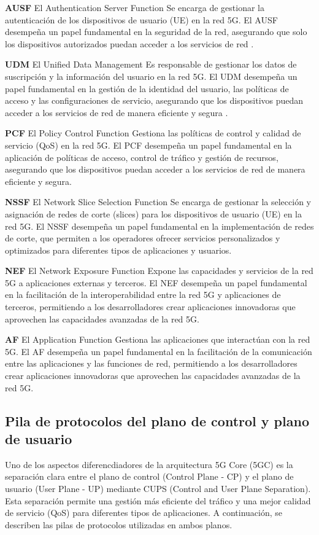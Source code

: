 \textbf{AUSF} El Authentication Server Function Se encarga de gestionar la autenticación de los dispositivos de usuario (UE) en la red 5G. El AUSF desempeña un papel fundamental en la seguridad de la red, asegurando que solo los dispositivos autorizados puedan acceder a los servicios de red \cite{3gpp.23.501}. 

\textbf{UDM} El Unified Data Management Es responsable de gestionar los datos de suscripción y la información del usuario en la red 5G. El UDM desempeña un papel fundamental en la gestión de la identidad del usuario, las políticas de acceso y las configuraciones de servicio, asegurando que los dispositivos puedan acceder a los servicios de red de manera eficiente y segura \cite{3gpp.23.501}.

\textbf{PCF} El Policy Control Function Gestiona las políticas de control y calidad de servicio (QoS) en la red 5G. El PCF desempeña un papel fundamental en la aplicación de políticas de acceso, control de tráfico y gestión de recursos, asegurando que los dispositivos puedan acceder a los servicios de red de manera eficiente y segura.

\textbf{NSSF} El Network Slice Selection Function Se encarga de gestionar la selección y asignación de redes de corte (slices) para los dispositivos de usuario (UE) en la red 5G. El NSSF desempeña un papel fundamental en la implementación de redes de corte, que permiten a los operadores ofrecer servicios personalizados y optimizados para diferentes tipos de aplicaciones y usuarios.

\textbf{NEF} El Network Exposure Function Expone las capacidades y servicios de la red 5G a aplicaciones externas y terceros. El NEF desempeña un papel fundamental en la facilitación de la interoperabilidad entre la red 5G y aplicaciones de terceros, permitiendo a los desarrolladores crear aplicaciones innovadoras que aprovechen las capacidades avanzadas de la red 5G.

\textbf{AF} El Application Function Gestiona las aplicaciones que interactúan con la red 5G. El AF desempeña un papel fundamental en la facilitación de la comunicación entre las aplicaciones y las funciones de red, permitiendo a los desarrolladores crear aplicaciones innovadoras que aprovechen las capacidades avanzadas de la red 5G.


\subsection{Pila de protocolos del plano de control y plano de usuario}
Uno de los aspectos diferencdiadores de la arquitectura 5G Core (5GC) es la separación clara entre el plano de control (Control Plane - CP) y el plano de usuario (User Plane - UP) mediante CUPS (Control and User Plane Separation). Esta separación permite una gestión más eficiente del tráfico y una mejor calidad de servicio (QoS) para diferentes tipos de aplicaciones. A continuación, se describen las pilas de protocolos utilizadas en ambos planos.
